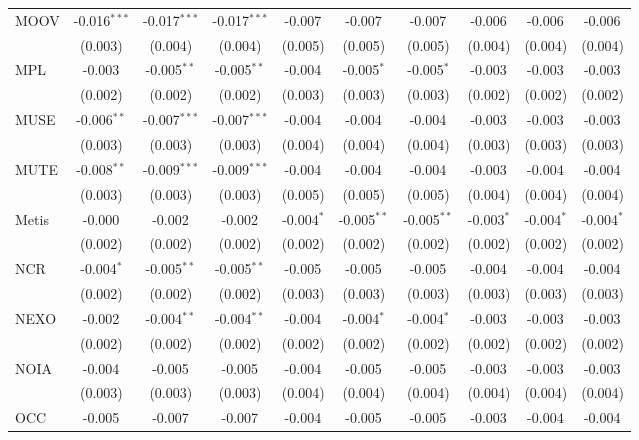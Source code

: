 \begin{table}[!htbp]
\begin{tabular}{@{\extracolsep{5pt}}lccccccccc}
 MOOV & -0.016$^{***}$ & -0.017$^{***}$ & -0.017$^{***}$ & -0.007$^{}$ & -0.007$^{}$ & -0.007$^{}$ & -0.006$^{}$ & -0.006$^{}$ & -0.006$^{}$ \\
  & (0.003) & (0.004) & (0.004) & (0.005) & (0.005) & (0.005) & (0.004) & (0.004) & (0.004) \\
 MPL & -0.003$^{}$ & -0.005$^{**}$ & -0.005$^{**}$ & -0.004$^{}$ & -0.005$^{*}$ & -0.005$^{*}$ & -0.003$^{}$ & -0.003$^{}$ & -0.003$^{}$ \\
  & (0.002) & (0.002) & (0.002) & (0.003) & (0.003) & (0.003) & (0.002) & (0.002) & (0.002) \\
 MUSE & -0.006$^{**}$ & -0.007$^{***}$ & -0.007$^{***}$ & -0.004$^{}$ & -0.004$^{}$ & -0.004$^{}$ & -0.003$^{}$ & -0.003$^{}$ & -0.003$^{}$ \\
  & (0.003) & (0.003) & (0.003) & (0.004) & (0.004) & (0.004) & (0.003) & (0.003) & (0.003) \\
 MUTE & -0.008$^{**}$ & -0.009$^{***}$ & -0.009$^{***}$ & -0.004$^{}$ & -0.004$^{}$ & -0.004$^{}$ & -0.003$^{}$ & -0.004$^{}$ & -0.004$^{}$ \\
  & (0.003) & (0.003) & (0.003) & (0.005) & (0.005) & (0.005) & (0.004) & (0.004) & (0.004) \\
 Metis & -0.000$^{}$ & -0.002$^{}$ & -0.002$^{}$ & -0.004$^{*}$ & -0.005$^{**}$ & -0.005$^{**}$ & -0.003$^{*}$ & -0.004$^{*}$ & -0.004$^{*}$ \\
  & (0.002) & (0.002) & (0.002) & (0.002) & (0.002) & (0.002) & (0.002) & (0.002) & (0.002) \\
 NCR & -0.004$^{*}$ & -0.005$^{**}$ & -0.005$^{**}$ & -0.005$^{}$ & -0.005$^{}$ & -0.005$^{}$ & -0.004$^{}$ & -0.004$^{}$ & -0.004$^{}$ \\
  & (0.002) & (0.002) & (0.002) & (0.003) & (0.003) & (0.003) & (0.003) & (0.003) & (0.003) \\
 NEXO & -0.002$^{}$ & -0.004$^{**}$ & -0.004$^{**}$ & -0.004$^{}$ & -0.004$^{*}$ & -0.004$^{*}$ & -0.003$^{}$ & -0.003$^{}$ & -0.003$^{}$ \\
  & (0.002) & (0.002) & (0.002) & (0.002) & (0.002) & (0.002) & (0.002) & (0.002) & (0.002) \\
 NOIA & -0.004$^{}$ & -0.005$^{}$ & -0.005$^{}$ & -0.004$^{}$ & -0.005$^{}$ & -0.005$^{}$ & -0.003$^{}$ & -0.003$^{}$ & -0.003$^{}$ \\
  & (0.003) & (0.003) & (0.003) & (0.004) & (0.004) & (0.004) & (0.004) & (0.004) & (0.004) \\
 OCC & -0.005$^{}$ & -0.007$^{}$ & -0.007$^{}$ & -0.004$^{}$ & -0.005$^{}$ & -0.005$^{}$ & -0.003$^{}$ & -0.004$^{}$ & -0.004$^{}$ \\

\end{tabular}
\end{table}
